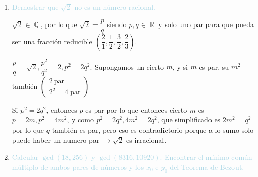 \documentclass[12pt]{article}
\newcommand{\bboxed}[1]{\fcolorbox{lightblue}{lightblue!10}{$#1$}}
\newcommand{\lb}[1]{\textcolor{lightblue}{#1}}
\DeclareMathOperator{\R}{\mathbb{R}}
\DeclareMathOperator{\Q}{\mathbb{Q}}
\DeclareMathOperator{\lcm}{lcm}
\begin{document}
\begin{enumerate}[label=\color{red}\textbf{\arabic*)}, leftmargin=*]
\begin{itemize}[label=\color{lightblue}$-$]
		$\gcd(334,562)=2$
		
		$\lcm(334,562)=\dfrac{|334\cdot562|}{\gcd(334,562)}=\dfrac{187708}{2}=96584$
		
		$\begin{aligned}
			2&=6-4\\
			&=6-(10-6)\\
			&=6\cdot2-10\\
			&=(16-10)\cdot2-10\\
			&=16\cdot2-10\cdot3\\
			&=16\cdot2-(10.6-16\cdot6)\cdot3\\
			&=16\cdot20-106\cdot3\\
			&=(228-106\cdot2)\cdot20-106\cdot3\\
			&=228\cdot20-106\cdot43\\
			&=228\cdot20-(334-228)\cdot43\\
			&=228\cdot63-334\cdot43\\
			&=(562-334)\cdot63-334\cdot43\\
			&=562\cdot63-334\cdot106
		\end{aligned}$
		
		$2=334\cdot x_0+562\cdot y_0\longrightarrow\bboxed{\begin{array}{l}
				x_0=-106\\
				y_0=63
		\end{array}}$
	\end{itemize}
	\item \lb{Demostrar que $\sqrt{2}$ no es un número racional.}
	
	$\sqrt{2}\in\Q$, por lo que $\sqrt{2}=\dfrac{p}{q}$ siendo $p,q\in\R$ y solo uno par para que pueda ser una fracción reducible $\left(\dfrac{2}{1},\dfrac{1}{2},\dfrac{3}{2},\dfrac{2}{3}\right)$.
	
	$\dfrac{p}{q}=\sqrt{2},\dfrac{p^2}{q^2}=2,p^2=2q^2$. Supongamos un cierto $m$, y si $m$ es par, su $m^2$ también $\left(\begin{array}{l}
		2\:\mathrm{par}\\
		2^2=4\:\mathrm{par}
	\end{array}\right)$
	
	Si $p^2=2q^2$, entonces $p$ es par por lo que entonces cierto $m$ es $p=2m,p^2=4m^2$, y como $p^2=2q^2,4m^2=2q^2$, que simplificado es $2m^2=q^2$ por lo que $q$ también es par, pero eso es contradictorio porque a lo sumo solo puede haber un numero par $\longrightarrow\sqrt{2}$ es irracional.
	\item \lb{Calcular $\gcd(18,256)$ y $\gcd(8316,10920)$. Encontrar el mínimo común múltiplo de ambos pares de números y los $x_0$ e $y_0$ del Teorema de Bezout.}
	

\end{enumerate}
\end{document}
